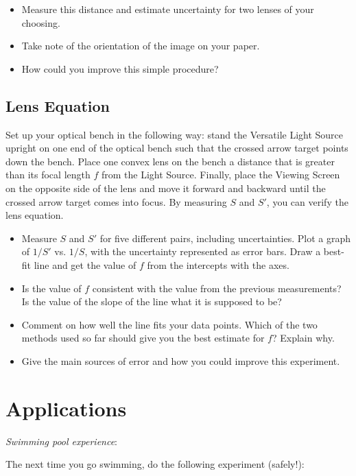 \begin{itemize}
\item Measure this distance and estimate uncertainty for two lenses of your choosing.
\item Take note of the orientation of the image on your paper.
\item How could you improve this simple procedure?
\end{itemize}

\subsection{Lens Equation}
\label{sec:lensequation}

Set up your optical bench in the following way: stand the Versatile Light Source upright on one end of the optical bench such that the crossed arrow target points down the bench.  Place one convex lens on the bench a distance that is greater than its focal length $f$ from the Light Source.  Finally, place the Viewing Screen on the opposite side of the lens and move it forward and backward until the crossed arrow target comes into focus.  By measuring $S$ and $S'$, you can verify the lens equation.
\begin{itemize}
\item Measure $S$ and $S'$ for five different pairs, including uncertainties. Plot a graph of $1/S'$ vs. $1/S$, with the uncertainty represented as error bars.  Draw a best-fit line and get the value of $f$ from the intercepts with the axes.
\item Is the value of $f$ consistent with the value from the previous measurements? Is the value of the slope of the line what it is supposed to be?
\item Comment on how well the line fits your data points.
Which of the two methods used so far should give you the best estimate for $f$? Explain why.
\item Give the main sources of error and how you could improve this experiment.
\end{itemize}
 
\section{Applications}

\emph{Swimming pool experience}:\vspace{0.6\baselineskip}

The next time you go swimming, do the following experiment (safely!):\myskip

